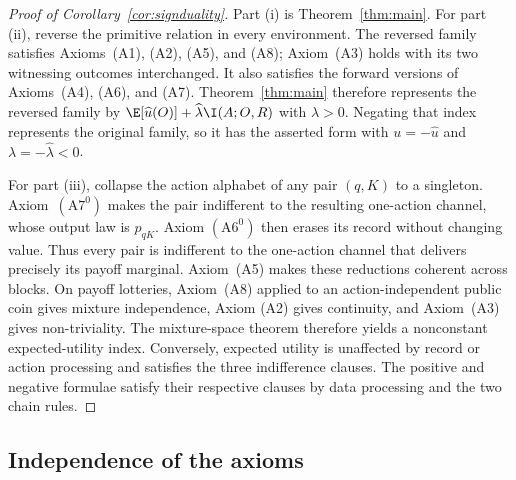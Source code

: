 \begin{proof}[Proof of Corollary~\ref{cor:signduality}]
Part \textup{(i)} is Theorem~\ref{thm:main}.  For part \textup{(ii)}, reverse
the primitive relation in every environment.  The reversed family satisfies
Axioms~\textup{(A1)}, \textup{(A2)}, \textup{(A5)}, and \textup{(A8)}; Axiom~\textup{(A3)} holds with
its two witnessing outcomes interchanged.  It also satisfies the forward
versions of Axioms~\textup{(A4)}, \textup{(A6)}, and
\textup{(A7)}.  Theorem~\ref{thm:main} therefore represents the reversed
family by
\(
  \E[\widehat u(O)]+\widehat\lambda\I(A;O,R)
\)
with \(\widehat\lambda>0\).  Negating that index represents the original
family, so it has the asserted form with
\(u=-\widehat u\) and \(\lambda=-\widehat\lambda<0\).

For part \textup{(iii)}, collapse the action alphabet of any pair $(q,K)$ to
a singleton.  Axiom~$(\mathrm{A}7^0)$ makes the pair indifferent to the
resulting one-action channel, whose output law is $p_{qK}$.  Axiom
$(\mathrm{A}6^0)$ then erases its record without changing value.  Thus every
pair is indifferent to the one-action channel that delivers precisely its
payoff marginal.  Axiom~\textup{(A5)} makes these reductions coherent across
blocks.  On payoff lotteries, Axiom~\textup{(A8)} applied to an
action-independent public coin gives mixture independence, Axiom
\textup{(A2)} gives continuity, and Axiom~\textup{(A3)} gives
non-triviality.  The mixture-space theorem therefore yields a nonconstant
expected-utility index.  Conversely, expected utility is unaffected by record
or action processing and satisfies the three indifference clauses.  The
positive and negative formulae satisfy their respective clauses by data
processing and the two chain rules.
\end{proof}

\subsection{Independence of the axioms}\label{app:axiom-independence}

